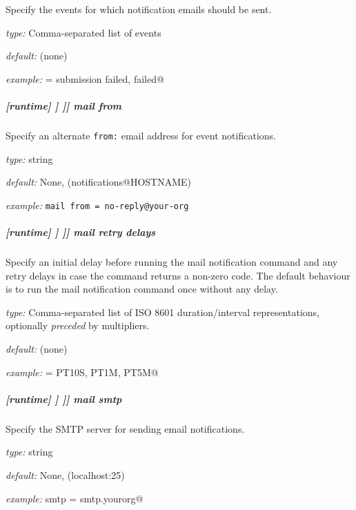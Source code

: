 Specify the events for which notification emails should be sent.

\begin{myitemize}
    \item {\em type:} Comma-separated list of events
    \item {\em default:} (none)
    \item {\em example:} \lstinline@handler = submission failed, failed@
\end{myitemize}

\subparagraph[mail from]{[runtime] \textrightarrow [[\_\_NAME\_\_]] \textrightarrow [[[events]]] \textrightarrow mail from}

Specify an alternate \lstinline=from:= email address for event notifications.

\begin{myitemize}
    \item {\em type:} string
    \item {\em default:} None, (notifications@HOSTNAME)
    \item {\em example:} \lstinline|mail from = no-reply@your-org|
\end{myitemize}

\subparagraph[mail retry delays]{[runtime] \textrightarrow [[\_\_NAME\_\_]] \textrightarrow [[[events]]] \textrightarrow mail retry delays}

Specify an initial delay before running the mail notification command and any
retry delays in case the command returns a non-zero code. The default behaviour
is to run the mail notification command once without any delay.

\begin{myitemize}
    \item {\em type:} Comma-separated list of ISO 8601 duration/interval representations, optionally {\em preceded} by multipliers.
    \item {\em default:} (none)
    \item {\em example:} \lstinline@handler = PT10S, PT1M, PT5M@
\end{myitemize}

\subparagraph[mail smtp]{[runtime] \textrightarrow [[\_\_NAME\_\_]] \textrightarrow [[[events]]] \textrightarrow mail smtp}

Specify the SMTP server for sending email notifications.

\begin{myitemize}
    \item {\em type:} string
    \item {\em default:} None, (localhost:25)
    \item {\em example:} \lstinline@mail smtp = smtp.yourorg@
\end{myitemize}

